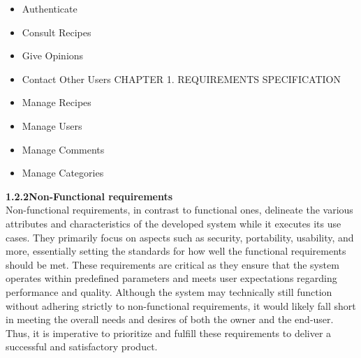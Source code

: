 \documentclass{article}
\begin{document}
\begin{itemize}[label=$\bullet$]
	\item Authenticate
	\item Consult Recipes
	\item Give Opinions
	\item Contact Other Users
\newpage
\noindent
CHAPTER 1.  REQUIREMENTS SPECIFICATION \\
\underline{\hspace{\textwidth}} \vspace{0.1cm}
	\item Manage Recipes	
	\item Manage Users
	\item Manage Comments 
	\item Manage Categories
\end{itemize}
\vspace{0.5cm}
{\large \textbf{1.2.2\hspace{1em}Non-Functional requirements}}
\vspace{0.2cm}
\\Non-functional requirements, in contrast to functional ones, delineate the various attributes and characteristics of the developed system while it executes its use cases. They primarily focus on aspects such as security, portability, usability, and more, essentially setting the standards for how well the functional requirements should be met. These requirements are critical as they ensure that the system operates within predefined parameters and meets user expectations regarding performance and quality. Although the system may technically still function without adhering strictly to non-functional requirements, it would likely fall short in meeting the overall needs and desires of both the owner and the end-user. Thus, it is imperative to prioritize and fulfill these requirements to deliver a successful and satisfactory product.\vspace{0.1cm}
\end{document}
